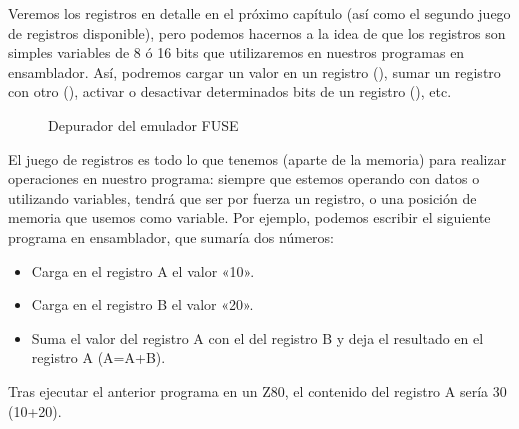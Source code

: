 \documentclass[letterpaper,10pt,spanish]{sphinxmanual}
\begin{document}
Veremos los registros en detalle en el próximo capítulo (así como el segundo juego de registros disponible), pero podemos hacernos a la idea de que los registros son simples variables de 8 ó 16 bits que utilizaremos en nuestros programas en ensamblador. Así, podremos cargar un valor en un registro (), sumar un registro con otro (), activar o desactivar determinados bits de un registro (), etc.

\begin{figure}[htbp]
\centering
\capstart

\noindent{}
\caption{Depurador del emulador FUSE}\label{\detokenize{03_arquitectura/arquitectura:id3}}\end{figure}

El juego de registros es todo lo que tenemos (aparte de la memoria) para realizar operaciones en nuestro programa: siempre que estemos operando con datos o utilizando variables, tendrá que ser por fuerza un registro, o una posición de memoria que usemos como variable. Por ejemplo, podemos escribir el siguiente programa en ensamblador, que sumaría dos números:

\begin{sphinxVerbatim}[commandchars=\\\{\}]
     
     
     

             
\end{sphinxVerbatim}
\begin{itemize}
\item {} 
Carga en el registro A el valor «10».

\item {} 
Carga en el registro B el valor «20».

\item {} 
Suma el valor del registro A con el del registro B y deja el resultado en el registro A (A=A+B).

\end{itemize}

Tras ejecutar el anterior programa en un Z80, el contenido del registro A sería 30 (10+20).
\end{document}
